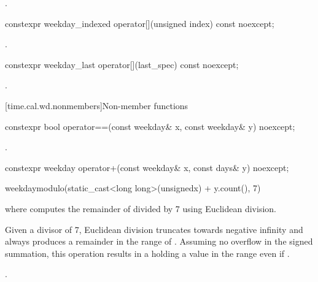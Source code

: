 \begin{itemdescr}
\pnum
\returns {}.
\end{itemdescr}

%
\begin{itemdecl}
constexpr weekday_indexed operator[](unsigned index) const noexcept;
\end{itemdecl}

\begin{itemdescr}
\pnum
\returns {}.
\end{itemdescr}

%
\begin{itemdecl}
constexpr weekday_last operator[](last_spec) const noexcept;
\end{itemdecl}

\begin{itemdescr}
\pnum
\returns {}.
\end{itemdescr}

[time.cal.wd.nonmembers]{Non-member functions}

%
\begin{itemdecl}
constexpr bool operator==(const weekday& x, const weekday& y) noexcept;
\end{itemdecl}

\begin{itemdescr}
\pnum
\returns {}.
\end{itemdescr}

%
\begin{itemdecl}
constexpr weekday operator+(const weekday& x, const days& y) noexcept;
\end{itemdecl}

\begin{itemdescr}
\pnum
\returns
\begin{codeblock}
weekday{modulo(static_cast<long long>(unsigned{x}) + y.count(), 7)}
\end{codeblock}
where  computes the remainder of  divided by 7 using Euclidean division.
\begin{note}
Given a divisor of 7, Euclidean division truncates towards negative infinity and
always produces a remainder in the range of .
Assuming no overflow in the signed summation,
this operation results in a  holding a value in the range  even if .
\end{note}
\begin{example}
.
\end{example}
\end{itemdescr}

